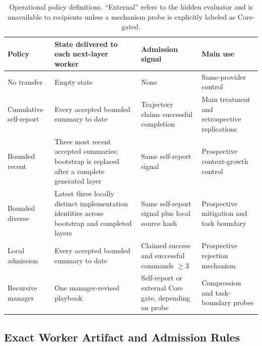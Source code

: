 \documentclass[letterpaper]{article}
\begin{document}
\begin{table}[t]
\centering
\caption{Operational policy definitions. ``External'' refers to the hidden
evaluator and is unavailable to recipients unless a mechanism probe is
explicitly labeled as Core-gated.}
\label{tab:supp-policies}
\small
\begin{tabular}{p{}p{}p{}p{}}
\toprule
Policy & State delivered to each next-layer worker & Admission signal & Main use \\
\midrule
No transfer & Empty state & None & Same-provider control \\
Cumulative self-report & Every accepted bounded summary to date & Trajectory claims successful completion & Main treatment and retrospective replications \\
Bounded recent & Three most recent accepted summaries; bootstrap is replaced after a complete generated layer & Same self-report signal & Prospective context-growth control \\
Bounded diverse & Latest three locally distinct implementation identities across bootstrap and completed layers & Same self-report signal plus local source hash & Prospective mitigation and task boundary \\
Local admission & Every accepted bounded summary to date & Claimed success and successful commands $\geq3$ & Prospective rejection mechanism \\
Recursive manager & One manager-revised playbook & Self-report or external Core gate, depending on probe & Compression and task-boundary probes \\
\bottomrule
\end{tabular}
\end{table}

\subsection{Exact Worker Artifact and Admission Rules}
\end{document}
